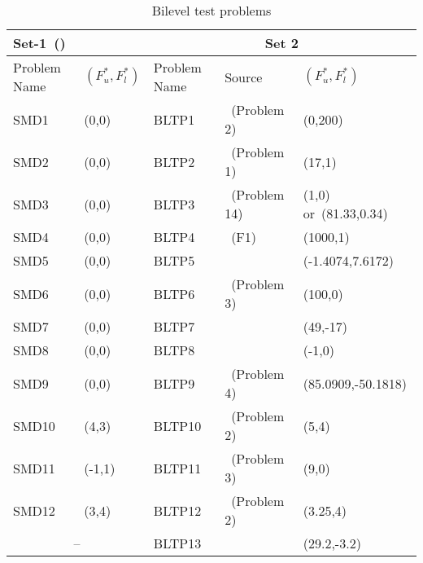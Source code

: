 \begin{table}[!ht]\scriptsize
\centering
\caption{Bilevel test problems}
\label{BLTP-pro}
\begin{tabular}{|l|l|l|l|l|}
\hline
\multicolumn{2}{|l|}{Set-1~(\cite{sinha2014test})} & \multicolumn{3}{c|}{Set 2}                 \\ \hline
Problem Name  & $(F_u^{*},F_l^{*})$ & Problem Name & Source & $(F_u^{*},F_l^{*})$       \\ \hline
SMD1          & (0,0)       & BLTP1        &\cite{aiyoshi1984solution}~(Problem 2)       & (0,200)            \\ \hline
SMD2          & (0,0)       & BLTP2        &\cite{bard1988convex}~(Problem 1)            & (17,1)             \\ \hline
SMD3          & (0,0)       & BLTP3        &\cite{Angelobilevel}~(Problem 14)            & (1,0) or~(81.33,0.34)              \\ \hline
SMD4          & (0,0)       & BLTP4        &\cite{oduguwa2002bi}~(F1)                    & (1000,1)           \\ \hline
SMD5          & (0,0)       & BLTP5        &\cite{savard1994steepest}                    & (-1.4074,7.6172)   \\ \hline
SMD6          & (0,0)       & BLTP6        &\cite{bard1988convex}~(Problem 3)            & (100,0)            \\ \hline
SMD7          & (0,0)       & BLTP7        &\cite{anandalingam1990solution}              & (49,-17)           \\ \hline
SMD8          & (0,0)       & BLTP8        &\cite{falk1995bilevel}                       & (-1,0)             \\ \hline
SMD9          & (0,0)       & BLTP9        &\cite{rajesh2003tabu}~(Problem 4)            & (85.0909,-50.1818) \\ \hline
SMD10         & (4,3)       & BLTP10       &\cite{rajesh2003tabu}~(Problem 2)            & (5,4)              \\ \hline
SMD11         & (-1,1)      & BLTP11       &\cite{rajesh2003tabu}~(Problem 3)            & (9,0)              \\ \hline
SMD12         & (3,4)       & BLTP12       &\cite{bard1982explicit}~(Problem 2)          & (3.25,4)           \\ \hline
 \multicolumn{2}{|c|}{--}   & BLTP13       &\cite{candler1982linear}                     & (29.2,-3.2)        \\ \hline
\end{tabular}
\end{table}


